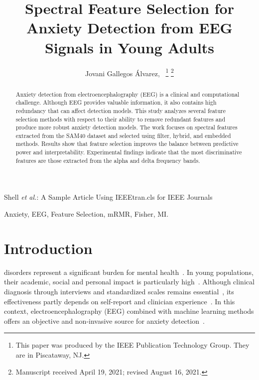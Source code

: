 \documentclass[lettersize,journal]{IEEEtran}
\begin{document}
\title{Spectral Feature Selection for Anxiety Detection from EEG Signals in Young Adults}

\author{Jovani Gallegos Álvarez,~
\thanks{This paper was produced by the IEEE Publication Technology Group. They are in Piscataway, NJ.}%
\thanks{Manuscript received April 19, 2021; revised August 16, 2021.}}

%
{Shell \MakeLowercase{\textit{et al.}}: A Sample Article Using IEEEtran.cls for IEEE Journals}


\maketitle

\begin{abstract}
Anxiety detection from electroencephalography (EEG) is a clinical and computational challenge. Although EEG provides valuable information, it also contains high redundancy that can affect detection models. This study analyzes several feature selection methods with respect to their ability to remove redundant features and produce more robust anxiety detection models. The work focuses on spectral features extracted from the SAM40 dataset and selected using filter, hybrid, and embedded methods. Results show that feature selection improves the balance between predictive power and interpretability. Experimental findings indicate that the most discriminative features are those extracted from the alpha and delta frequency bands.
\end{abstract}

\begin{IEEEkeywords}
Anxiety, EEG, Feature Selection, mRMR, Fisher, MI.
\end{IEEEkeywords}


\section{Introduction}
 disorders represent a significant burden for mental health~\cite{WHOICD11}. In young populations, their academic, social and personal impact is particularly high~\cite{Chand2025}. Although clinical diagnosis through interviews and standardized scales remains essential~\cite{Hamilton1959}, its effectiveness partly depends on self-report and clinician experience~\cite{SCID2018}. In this context, electroencephalography (EEG) combined with machine learning methods offers an objective and non-invasive source for anxiety detection~\cite{StatPearlsEEG2023}.
\end{document}
